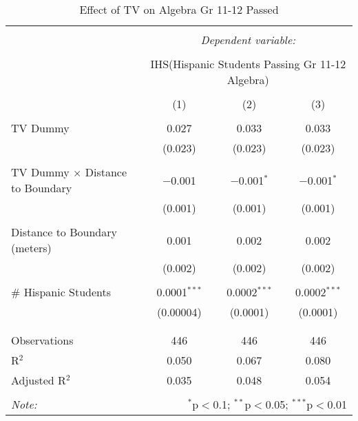 
\begin{table}[!htbp] \centering 
  \caption{Effect of TV on Algebra Gr 11-12 Passed} 
  \label{} 
\begin{tabular}{@{\extracolsep{-2pt}}lccc} 
\\[-1.8ex]\hline 
\hline \\[-1.8ex] 
 & \multicolumn{3}{c}{\textit{Dependent variable:}} \\ 
\cline{2-4} 
\\[-1.8ex] & \multicolumn{3}{c}{IHS(Hispanic Students Passing Gr 11-12 Algebra)} \\ 
\\[-1.8ex] & (1) & (2) & (3)\\ 
\hline \\[-1.8ex] 
 TV Dummy & 0.027 & 0.033 & 0.033 \\ 
  & (0.023) & (0.023) & (0.023) \\ 
  & & & \\ 
 TV Dummy $\times$ Distance to Boundary & $-$0.001 & $-$0.001$^{*}$ & $-$0.001$^{*}$ \\ 
  & (0.001) & (0.001) & (0.001) \\ 
  & & & \\ 
 Distance to Boundary (meters) & 0.001 & 0.002 & 0.002 \\ 
  & (0.002) & (0.002) & (0.002) \\ 
  & & & \\ 
 \# Hispanic Students & 0.0001$^{***}$ & 0.0002$^{***}$ & 0.0002$^{***}$ \\ 
  & (0.00004) & (0.0001) & (0.0001) \\ 
  & & & \\ 
\hline \\[-1.8ex] 
Observations & 446 & 446 & 446 \\ 
R$^{2}$ & 0.050 & 0.067 & 0.080 \\ 
Adjusted R$^{2}$ & 0.035 & 0.048 & 0.054 \\ 
\hline 
\hline \\[-1.8ex] 
\textit{Note:}  & \multicolumn{3}{r}{$^{*}$p$<$0.1; $^{**}$p$<$0.05; $^{***}$p$<$0.01} \\ 
\end{tabular} 
\end{table} 
